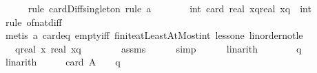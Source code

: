 \begin{isabellebody}
\ \ \ \ \isamarkupfalse%
\ {\isacharparenleft}{\kern0pt}rule\ card{\isacharunderscore}{\kern0pt}Diff{\isacharunderscore}{\kern0pt}singleton{\isacharcomma}{\kern0pt}\ rule\ a{\isacharparenright}{\kern0pt}\isanewline
\ \ \isamarkupfalse%
\ \isamarkupfalse%
\ {\isachardoublequoteopen}{\isachardot}{\kern0pt}{\isachardot}{\kern0pt}{\isachardot}{\kern0pt}\ {\isacharequal}{\kern0pt}\ int\ {\isacharparenleft}{\kern0pt}card\ {\isacharbraceleft}{\kern0pt}{\isasymlceil}real\ x{\isacharminus}{\kern0pt}q{\isasymrceil}{\isachardot}{\kern0pt}{\isachardot}{\kern0pt}{\isasymlfloor}real\ x{\isacharplus}{\kern0pt}q{\isasymrfloor}{\isacharbraceright}{\kern0pt}{\isacharparenright}{\kern0pt}\ {\isacharminus}{\kern0pt}\ int\ {}{\isachardoublequoteclose}\isanewline
\ \ \ \ \isamarkupfalse%
\ {\isacharparenleft}{\kern0pt}rule\ of{\isacharunderscore}{\kern0pt}nat{\isacharunderscore}{\kern0pt}diff{\isacharparenright}{\kern0pt}\isanewline
\ \ \ \ \isamarkupfalse%
\ {\isacharparenleft}{\kern0pt}metis\ a\ card{\isacharunderscore}{\kern0pt}{}{\isacharunderscore}{\kern0pt}eq\ empty{\isacharunderscore}{\kern0pt}iff\ finite{\isacharunderscore}{\kern0pt}atLeastAtMost{\isacharunderscore}{\kern0pt}int\ less{\isacharunderscore}{\kern0pt}one\ linorder{\isacharunderscore}{\kern0pt}not{\isacharunderscore}{\kern0pt}le{\isacharparenright}{\kern0pt}\isanewline
\ \ \isamarkupfalse%
\ \isamarkupfalse%
\ {\isachardoublequoteopen}{\isachardot}{\kern0pt}{\isachardot}{\kern0pt}{\isachardot}{\kern0pt}\ {\isasymle}\ {\isasymlfloor}q{\isacharplus}{\kern0pt}real\ x{\isasymrfloor}{\isacharplus}{\kern0pt}{}\ {\isacharminus}{\kern0pt}{\isasymlceil}real\ x{\isacharminus}{\kern0pt}q{\isasymrceil}\ {\isacharminus}{\kern0pt}\ {}{\isachardoublequoteclose}\isanewline
\ \ \ \ \isamarkupfalse%
\ assms\isanewline
\ \ \ \ \isamarkupfalse%
\ simp\isanewline
\ \ \ \ \isamarkupfalse%
\ linarith\isanewline
\ \ \isamarkupfalse%
\ \isamarkupfalse%
\ {\isachardoublequoteopen}{\isachardot}{\kern0pt}{\isachardot}{\kern0pt}{\isachardot}{\kern0pt}\ {\isasymle}\ {}{\isacharasterisk}{\kern0pt}q{\isachardoublequoteclose}\isanewline
\ \ \ \ \isamarkupfalse%
\ linarith\isanewline
\ \ \isamarkupfalse%
\ \isamarkupfalse%
\ {\isachardoublequoteopen}card\ A\ {\isasymle}\ {}\ {\isacharasterisk}{\kern0pt}\ q{\isachardoublequoteclose}\isanewline

\end{isabellebody}
